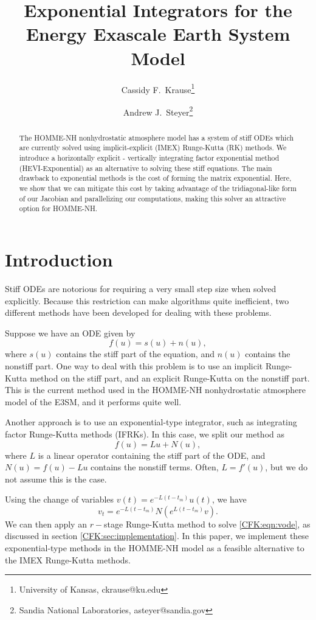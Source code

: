 \documentclass{csri19}
\title{Exponential Integrators for the Energy Exascale Earth System Model}
\author{Cassidy F.\ Krause\thanks{University of Kansas, ckrause@ku.edu}
\and Andrew J.\ Steyer\thanks{Sandia National Laboratories, asteyer@sandia.gov}}
\begin{document}
\maketitle

\begin{abstract}
The HOMME-NH nonhydrostatic atmosphere model has a system of stiff ODEs 
which are currently solved using implicit-explicit (IMEX) Runge-Kutta (RK) 
methods. We introduce a horizontally explicit - vertically integrating 
factor exponential method (HEVI-Exponential) as an alternative to solving 
these stiff equations. The main drawback to exponential methods is the cost
of forming the matrix exponential. Here, we show that we can mitigate this 
cost by taking advantage of the tridiagonal-like form of our Jacobian and 
parallelizing our computations, making this solver an attractive option for
HOMME-NH.
\end{abstract}

\section{Introduction} \label{CFK:sec:intro}
Stiff ODEs are notorious for requiring a very small step size when solved 
explicitly. Because this restriction can make algorithms quite inefficient,
 two different methods have been developed for dealing with these problems. 

Suppose we have an ODE given by \[ f(u) = s(u) + n(u),\] where $s(u)$ 
contains the stiff part of the equation, and $n(u)$ contains the nonstiff 
part. One way to deal with this problem is to use an implicit Runge-Kutta
method on the stiff part, and an explicit Runge-Kutta on the nonstiff part. 
This is the current method used in the HOMME-NH nonhydrostatic atmosphere 
model of the E3SM, and it performs quite well.

Another approach is to use an exponential-type integrator, such as 
integrating factor Runge-Kutta methods (IFRKs). In this case, we split our
 method as \[ f(u) = Lu + N(u),\] where $L$ is a linear operator containing
 the stiff part of the ODE, and $N(u) = f(u) - Lu$ contains the nonstiff 
terms. Often, $L = f'(u)$, but we do not assume this is the case. 

Using the change of variables $v(t) = e^{-L(t-t_m)}u(t)$, we have
\begin{equation}\label{CFK:eqn:vode}
v_t = e^{-L(t-t_m)}N(e^{L(t-t_m)}v).
\end{equation} 
We can then apply an $r-$stage Runge-Kutta method to solve 
\ref{CFK:eqn:vode}, as discussed in section \ref{CFK:sec:implementation}. 
In this paper, we implement these exponential-type methods in the HOMME-NH
 model as a feasible alternative to the IMEX Runge-Kutta methods.
\end{document}
